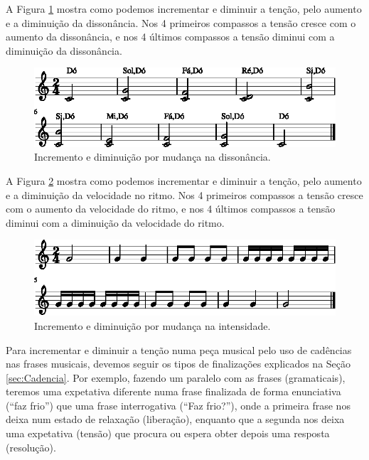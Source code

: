 \begin{example}
A Figura \ref{fig:tension-release-dissonancia-1} mostra como podemos incrementar e diminuir a tenção,
pelo aumento e a diminuição da dissonância. 
Nos 4 primeiros compassos a tensão cresce com o aumento da dissonância,
e nos 4 últimos compassos a tensão diminui com a diminuição da dissonância.
\end{example}
\begin{figure}[!h]
     \centering
     \includegraphics[width=1.0\textwidth]{chapters/cap-musica-topicos/tension-release-dissonancia-1.eps}
     \caption{Incremento e diminuição por mudança na dissonância.}
     \label{fig:tension-release-dissonancia-1}
\end{figure}


\begin{example}
A Figura \ref{fig:tension-release-ritmo-1} mostra como podemos incrementar e diminuir a tenção,
pelo aumento e a diminuição da velocidade no ritmo. 
Nos 4 primeiros compassos a tensão cresce com o aumento da velocidade do ritmo,
e nos 4 últimos compassos a tensão diminui com a diminuição da velocidade do ritmo.
\end{example}
\begin{figure}[!h]
     \centering
     \includegraphics[width=1.0\textwidth]{chapters/cap-musica-topicos/tension-release-ritmo-1.eps}
     \caption{Incremento e diminuição por mudança na intensidade.}
     \label{fig:tension-release-ritmo-1}
\end{figure}

\begin{example}
Para incrementar e diminuir a tenção numa peça musical pelo uso de cadências nas frases musicais,
devemos seguir os tipos de finalizações explicados na Seção \ref{sec:Cadencia}.
Por exemplo, fazendo um paralelo com as frases (gramaticais),
teremos uma expetativa diferente numa frase finalizada de forma enunciativa (``faz frio'') 
que uma frase interrogativa (``Faz frio?''), 
onde a primeira frase nos deixa num estado de relaxação (liberação),
enquanto que a segunda nos deixa uma expetativa (tensão) 
que procura ou espera obter depois uma resposta (resolução).  
\end{example}

% 

